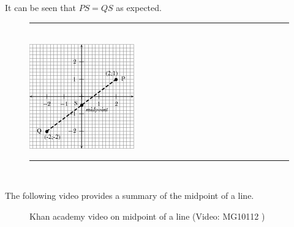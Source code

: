         
        \label{m39119*id69633}It can be seen that \begin{math}PS=QS\end{math} as expected.\par 
        
    \setcounter{subfigure}{0}


	\begin{figure}[H] %
    \begin{center}
    \rule[.1in]{\figurerulewidth}{.005in} \\
        \label{m39119*uid45!!!underscore!!!media}\label{m39119*uid45!!!underscore!!!printimage}\includegraphics{col11306.imgs/m39119_MG10C14_020.png} %
        
      \vspace{2pt}
    \vspace{.1in}
    \rule[.1in]{\figurerulewidth}{.005in} \\
        
    \end{center}

 \end{figure}   

    \addtocounter{footnote}{-0}
    \label{m39119*eip-891}The following video provides a summary of the midpoint of a line.

    \setcounter{subfigure}{0}


	\begin{figure}[H] %
    
    
    \textnormal{Khan academy video on midpoint of a line}\vspace{.1in} \nopagebreak
  \label{m39119*yt-media2}\label{m39119*yt-video2}
             { (Video:  MG10112 )}
      
      \vspace{2pt}
    \vspace{.1in}
    
    

 \end{figure}   

